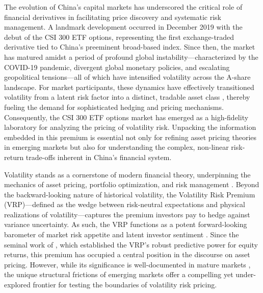 \documentclass[a4paper, 12pt]{article}    %
\begin{document}
The evolution of China’s capital markets has underscored the critical role of financial derivatives in facilitating price discovery and systematic risk management. A landmark development occurred in December 2019 with the debut of the CSI 300 ETF options, representing the first exchange-traded derivative tied to China’s preeminent broad-based index. Since then, the market has matured amidst a period of profound global instability—characterized by the COVID-19 pandemic, divergent global monetary policies, and escalating geopolitical tensions—all of which have intensified volatility across the A-share landscape. For market participants, these dynamics have effectively transitioned volatility from a latent risk factor into a distinct, tradable asset class \citep{carr2001volatilitytrading}, thereby fueling the demand for sophisticated hedging and pricing mechanisms. Consequently, the CSI 300 ETF options market has emerged as a high-fidelity laboratory for analyzing the pricing of volatility risk. Unpacking the information embedded in this premium is essential not only for refining asset pricing theories in emerging markets but also for understanding the complex, non-linear risk-return trade-offs inherent in China’s financial system.

Volatility stands as a cornerstone of modern financial theory, underpinning the mechanics of asset pricing, portfolio optimization, and risk management \citep{merton1973, engle1982arch}. Beyond the backward-looking nature of historical volatility, the Volatility Risk Premium (VRP)—defined as the wedge between risk-neutral expectations and physical realizations of volatility—captures the premium investors pay to hedge against variance uncertainty. As such, the VRP functions as a potent forward-looking barometer of market risk appetite and latent investor sentiment \citep{bollerslev2009, carr2009variance}. Since the seminal work of \cite{bollerslev2009}, which established the VRP’s robust predictive power for equity returns, this premium has occupied a central position in the discourse on asset pricing. However, while its significance is well-documented in mature markets \citep{bollerslev2014stock}, the unique structural frictions of emerging markets offer a compelling yet under-explored frontier for testing the boundaries of volatility risk pricing.
\end{document}
